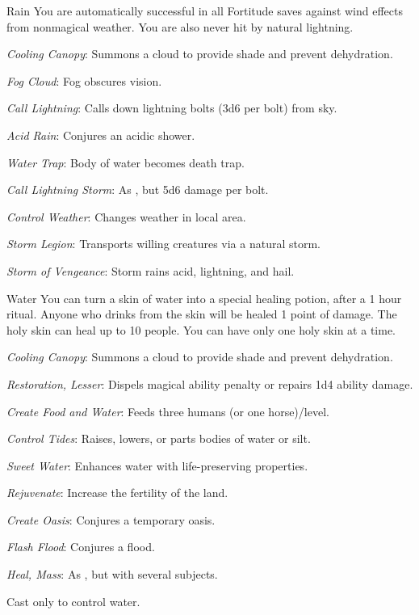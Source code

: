 {Rain}
{You are automatically successful in all Fortitude saves against wind effects from nonmagical weather. You are also never hit by natural lightning.}
{
	\item \textit{Cooling Canopy}: Summons a cloud to provide shade and prevent dehydration.
	\item \textit{Fog Cloud}: Fog obscures vision.
	\item \textit{Call Lightning}: Calls down lightning bolts (3d6 per bolt) from sky.
	\item \textit{Acid Rain}: Conjures an acidic shower.
	\item \textit{Water Trap}: Body of water becomes death trap.
	\item \textit{Call Lightning Storm}: As , but 5d6 damage per bolt.
	\item \textit{Control Weather}: Changes weather in local area.
	\item \textit{Storm Legion}: Transports willing creatures via a natural storm.
	\item \textit{Storm of Vengeance}: Storm rains acid, lightning, and hail.
}

{Water}
{You can turn a skin of water into a special healing potion, after a 1 hour ritual. Anyone who drinks from the skin will be healed 1 point of damage. The holy skin can heal up to 10 people. You can have only one holy skin at a time.}
{
	\item \textit{Cooling Canopy}: Summons a cloud to provide shade and prevent dehydration.
	\item \textit{Restoration, Lesser}: Dispels magical ability penalty or repairs 1d4 ability damage.
	\item \textit{Create Food and Water}: Feeds three humans (or one horse)/level.
	\item \textit{Control Tides}\footnotemark[1]: Raises, lowers, or parts bodies of water or silt.
	\item \textit{Sweet Water}: Enhances water with life-preserving properties.
	\item \textit{Rejuvenate}: Increase the fertility of the land.
	\item \textit{Create Oasis}: Conjures a temporary oasis.
	\item \textit{Flash Flood}: Conjures a flood.
	\item \textit{Heal, Mass}: As , but with several subjects.
}
 Cast only to control water.

